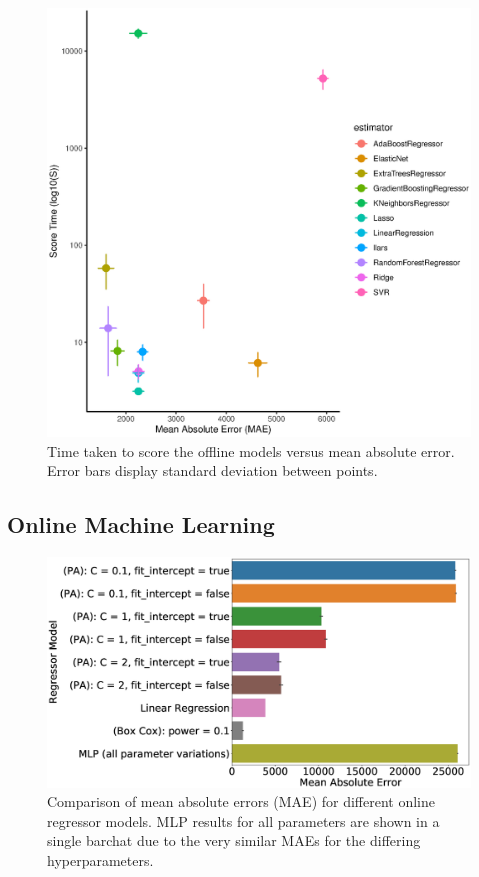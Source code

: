\documentclass[final,3p,times,twocolumn,numbers]{elsarticle}
\begin{document}
\begin{figure}
\centering
\includegraphics[width=\columnwidth,natwidth=500,natheight=500]{figures/results/offline_score_time_vs_mae.eps}
\caption{Time taken to score the offline models versus mean absolute error. Error bars display standard deviation between points.}
\label{fig:offline_score_time_vs_mae}
\end{figure}






\subsection{Online Machine Learning}

\begin{figure}[!htbp]
\includegraphics[width=\columnwidth,natwidth=1300,natheight=1300]{figures/results/online_model_mae_barplot.eps}
\caption{Comparison of mean absolute errors (MAE) for different online regressor models. MLP results for all parameters are shown in a single barchat due to the very similar MAEs for the differing hyperparameters.}
\label{fig:online_model_mae_barplot}
\end{figure}
\end{document}
